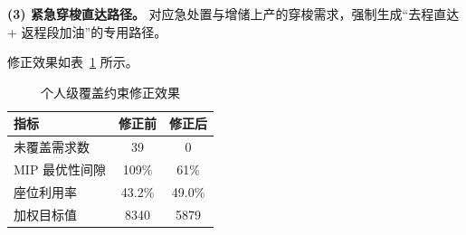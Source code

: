\textbf{(3) 紧急穿梭直达路径。} 对应急处置与增储上产的穿梭需求，强制生成``去程直达 + 返程段加油''的专用路径。

修正效果如表~\ref{tab:q3_correction} 所示。

\begin{table}[htbp]
\centering
\caption{个人级覆盖约束修正效果}
\label{tab:q3_correction}
\begin{tabular}{lcc}
\toprule
指标 & 修正前 & 修正后 \\
\midrule
未覆盖需求数 & 39 & 0 \\
MIP 最优性间隙 & 109\% & 61\% \\
座位利用率 & 43.2\% & 49.0\% \\
加权目标值 & 8340 & 5879 \\
\bottomrule
\end{tabular}
\end{table}
